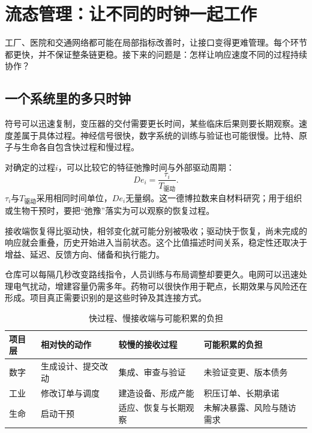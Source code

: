 \section{流态管理：让不同的时钟一起工作}

工厂、医院和交通网络都可能在局部指标改善时，让接口变得更难管理。每个环节都更快，并不保证整条链更稳。接下来的问题是：怎样让响应速度不同的过程持续协作？

\subsection{一个系统里的多只时钟}

符号可以迅速复制，变压器的交付需要更长时间，某些临床后果则要长期观察。速度差属于具体过程。神经信号很快，数字系统的训练与验证也可能很慢。比特、原子与生命各自包含快过程和慢过程。

对确定的过程$i$，可以比较它的特征弛豫时间与外部驱动周期：
\begin{equation}
De_i=\frac{\tau_i}{T_{\text{驱动}}}.
\end{equation}
$\tau_i$与$T_{\text{驱动}}$采用相同时间单位，$De_i$无量纲。这一德博拉数来自材料研究；用于组织或生物干预时，要把“弛豫”落实为可以观察的恢复过程。

接收端恢复得比驱动快，相邻变化就可能分别被吸收；驱动快于恢复，尚未完成的响应就会重叠，历史开始进入当前状态。这个比值描述时间关系，稳定性还取决于增益、延迟、反馈方向、储备和执行能力。

仓库可以每隔几秒改变路线指令，人员训练与布局调整却要更久。电网可以迅速处理电气扰动，增建容量仍需多年。药物可以很快作用于靶点，长期效果与风险还在形成。项目真正需要识别的是这些时钟及其连接方式。

\begin{table}[ht]
\centering
\caption{快过程、慢接收端与可能积累的负担}
\label{tab:ch4-three-media}
{\small
\begin{tabularx}{\textwidth}{@{}l >{\RaggedRight\arraybackslash}X >{\RaggedRight\arraybackslash}X >{\RaggedRight\arraybackslash}X@{}}
\toprule
项目层 & 相对快的动作 & 较慢的接收过程 & 可能积累的负担\\
\midrule
数字 & 生成设计、提交改动 & 集成、审查与验证 & 未验证变更、版本债务\\
工业 & 修改订单与调度 & 建造设备、形成产能 & 积压订单、长期承诺\\
生命 & 启动干预 & 适应、恢复与长期观察 & 未解决暴露、风险与随访需求\\
\bottomrule
\end{tabularx}}
\end{table}

